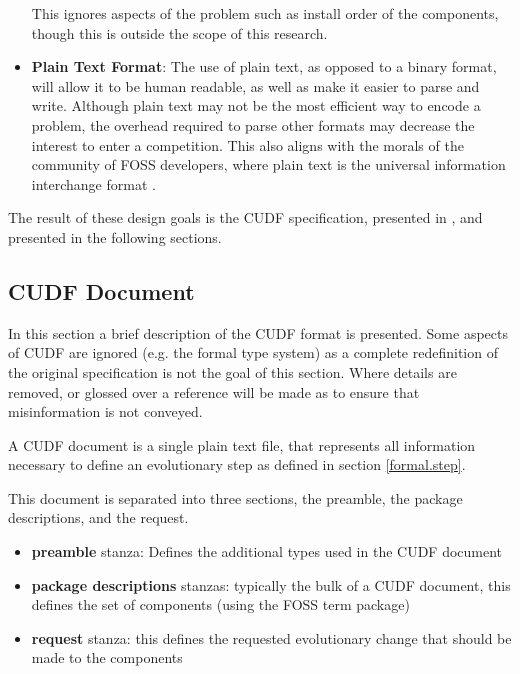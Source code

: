 \begin{itemize}
  This ignores aspects of the problem such as install order of the components, though this is outside the scope of this research.
  \item \textbf{Plain Text Format}:
  The use of plain text, as opposed to a binary format, will allow it to be human readable, as well as make it easier to parse and write.
  Although plain text may not be the most efficient way to encode a problem, the overhead required to parse other formats may decrease the interest to enter a competition.
  This also aligns with the morals of the community of FOSS developers, where plain text is the universal information interchange format \citep{raymond2003art}.
\end{itemize}

The result of these design goals is the CUDF specification, presented in \citep{treinen2009common}, and presented in the following sections.

\subsection{CUDF Document}
In this section a brief description of the CUDF format is presented.
Some aspects of CUDF are ignored (e.g. the formal type system) as a complete redefinition of the original specification is not the goal of this section.
Where details are removed, or glossed over a reference will be made as to ensure that misinformation is not conveyed. 

A CUDF document is a single plain text file, that represents all information necessary to define an evolutionary step as defined in section \ref{formal.step}.

This document is separated into three sections, the preamble, the package descriptions, and the request.

\begin{itemize}
  \item \textbf{preamble} stanza: Defines the additional types used in the CUDF document
  \item \textbf{package descriptions} stanzas: typically the bulk of a CUDF document, this defines the set of components (using the FOSS term package)
  \item \textbf{request} stanza: this defines the requested evolutionary change that should be made to the components 
\end{itemize}

